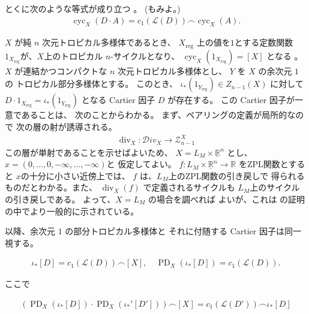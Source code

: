 \documentclass[a4paper,dvipdfmx,reqno,12pt]{amsart}
\theoremstyle{definition}
\newcommand{\opn}[1]{\operatorname{#1}}
\numberwithin{equation}{section}
\begin{document}
とくに次のような等式が成り立つ
\cite[Proposition 5.12]{MR4637248}。
(\cite[Theorem 4.15]{MR3894860}もみよ。)
\begin{align}
\opn{cyc}_X(D\cdot A)=c_1(\mathcal{L}(D))
\frown \opn{cyc}_X(A).
\end{align}

$X$ が純 $n$ 次元トロピカル多様体であるとき、
$X_{\mathrm{reg}}$ 上の値を$1$とする定数関数
$1_{X_{\mathrm{reg}}}$が、$X$上のトロピカル
$n$-サイクルとなり、
$\opn{cyc}_X(1_{X_{\mathrm{reg}}})=[X]$
となる \cite[]{MR4637248}。
$X$ が連結かつコンパクトな $n$ 次元トロピカル多様体とし、
$Y$ を $X$ の余次元 $1$ の
トロピカル部分多様体とする。
このとき、
$\iota_*(1_{Y_{\opn{reg}}})\in Z_{n-1}(X)$ に対して
$D\cdot 1_{X_{\mathrm{reg}}}=\iota_*(1_{Y_{\opn{reg}}})$
となる Cartier 因子 $D$ が存在する。
この Cartier 因子が一意であることは、
次のことからわかる。
まず、ペアリングの定義が局所的なので
次の層の射が誘導される。
\begin{align}
\opn{div}_X\colon \mathcal{D}iv_X\to 
\mathscr{Z}_{n-1}^{X}
\end{align}
この層が単射であることを示せばよいため、
$X=L_M\times \underline{\mathbb{R}}^{n}$ とし、
$x=(0,\ldots,0,-\infty,\ldots,-\infty)$と
仮定してよい。
$f\colon L_M\times \underline{\mathbb{R}}^{n}\to 
\mathbb{R}$ をZPL関数とすると
$x$の十分に小さい近傍上では、
$f$ は、$L_M$上のZPL関数の引き戻しで
得られるものだとわかる。また、
$\opn{div}_X(f)$ で定義されるサイクルも
$L_M$上のサイクルの引き戻しである。
よって、$X=L_M$ の場合を調べれば
よいが、これは
\cite[Theorem 4.5]{MR4246795}
の証明の中でより一般的に示されている。

以降、余次元 $1$ の部分トロピカル多様体と
それに付随する Cartier 因子は同一視する。

\begin{align}
\iota_*[D]=c_1(\mathcal{L}(D))\frown [X], \quad
\opn{PD}_X(\iota_*[D])=c_1(\mathcal{L}(D)).
\end{align}

ここで

\begin{align}
(\opn{PD}_X(\iota_*[D])\cdot \opn{PD}_X(\iota_*'[D']))\frown [X]=
c_1(\mathcal{L}(D'))\frown \iota_*[D]
\end{align}
\end{document}
